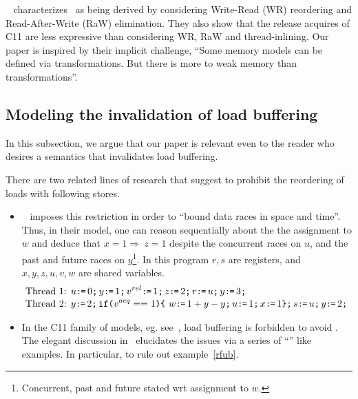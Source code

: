 ~\citet{DBLP:conf/fm/LahavV16} characterizes \tso\ as being derived by considering Write-Read (WR) reordering and Read-After-Write (RaW) elimination.  They also show that the release acquires of C11 are less expressive than considering WR, RaW and thread-inlining.  Our paper is inspired by their implicit challenge, ``Some memory models can be defined via transformations.
 But there is more to weak memory than transformations''.  

\subsection{Modeling the invalidation of load buffering} 

In this subsection, we argue that our paper is relevant even to the reader who desires a semantics that invalidates load buffering.  

There are two related lines of research that suggest to prohibit the reordering of loads with following stores.  
\begin{itemize}
\item 
~\citet{Dolan:2018:BDR:3192366.3192421} imposes this restriction in order to ``bound data races in space and time''.  Thus, in their model, one can reason sequentially about the the assignment to $w$ and deduce that $x=1 \Rightarrow\ z= 1$ despite the concurrent races on $u$, and  the past and future races on $y$\footnote{Concurrent, past and future stated wrt assignment to $w$.}.   In this program $r,s$ are registers, and $x,y,z,u,v,w$ are shared variables.
\begin{align*}
\mbox{Thread 1: } & u \texttt{:}\mkern-1mu\texttt{=}\, 0 \texttt{;}\, y \texttt{:}\mkern-1mu\texttt{=}\, 1 \texttt{;}\, v^{rel}  \texttt{:}\mkern-1mu\texttt{=}\, 1 \texttt{;}\, z \texttt{:}\mkern-1mu\texttt{=}\, 2 \texttt{;}\, r \texttt{:}\mkern-1mu\texttt{=}\, u \texttt{;}\, y \texttt{:}\mkern-1mu\texttt{=}\, 3 \texttt{;}\, \\[-.5ex]
\mbox{Thread 2: } & y \texttt{:}\mkern-1mu\texttt{=}\, 2 \texttt{;}\,  \texttt{if}\allowbreak\texttt{(}v^{acq}==1\texttt{)} \allowbreak\texttt{\{}\ w \texttt{:}\mkern-1mu\texttt{=}\, 1 + y -y \texttt{;}\, u \texttt{:}\mkern-1mu\texttt{=}\, 1 \texttt{;}\, x \texttt{:}\mkern-1mu\texttt{=}\, 1  \texttt{\}} \texttt{;}\, s \texttt{:}\mkern-1mu\texttt{=}\, u \texttt{;}\,  y \texttt{:}\mkern-1mu\texttt{=}\, 2 \texttt{;}\,
\end{align*}

\item In the C11 family of models, eg. see~\citep{Boehm:2014:OGA:2618128.2618134,DBLP:conf/pldi/LahavVKHD17,DBLP:conf/oopsla/VafeiadisN13}, load buffering is forbidden to avoid \oota. The elegant discussion in~\citet{BoehmOOTA} elucidates the issues via a series of ``\oota'' like examples.  In particular, to rule out example~\ref{rfub}.  
\end{itemize}

